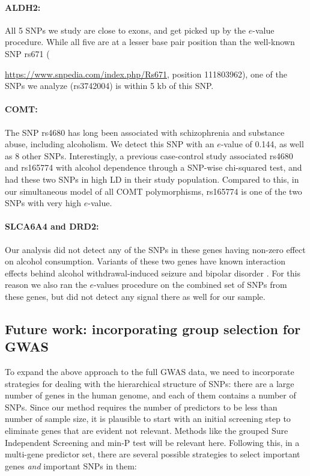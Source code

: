 \paragraph{ALDH2:} All 5 SNPs we study are close to exons, and get picked up by the $e$-value procedure. While all five are at a lesser base pair position than the well-known SNP rs671 ({\url{https://www.snpedia.com/index.php/Rs671}, position 111803962), one of the SNPs we analyze (rs3742004) is within 5 kb of this SNP.

\paragraph{COMT:} The SNP rs4680 has long been associated with schizophrenia and substance abuse, including alcoholism. We detect this SNP with an $e$-value of 0.144, as well as 8 other SNPs. Interestingly, a previous case-control study \citep{VoiseyEtal11} associated rs4680 and rs165774 with alcohol dependence through a SNP-wise chi-squared test, and had these two SNPs in high LD in their study population. Compared to this, in our simultaneous model of all COMT polymorphisms, rs165774 is one of the two SNPs with very high $e$-value.

\paragraph{SLCA6A4 and DRD2:} Our analysis did not detect any of the SNPs in these genes having non-zero effect on alcohol consumption. Variants of these two genes have known interaction effects behind alcohol withdrawal-induced seizure \citep{KarpyakEtal10} and bipolar disorder \citep{WangEtal14}. For this reason we also ran the $e$-values procedure on the combined set of SNPs from these genes, but did not detect any signal there as well for our sample.
 


\subsection{Future work: incorporating group selection for GWAS}
To expand the above approach to the full GWAS data, we need to incorporate strategies for dealing with the hierarchical structure of SNPs: there are a large number of genes in the human genome, and each of them contains a number of SNPs. Since our method requires the number of predictors to be less than number of sample size, it is plausible to start with an initial screening step to eliminate genes that are evident not relevant. Methods like the grouped Sure Independent Screening \citep{LiZhongZhu12} and min-P test \citep{WestfallYoungBook93} will be relevant here. Following this, in a multi-gene predictor set, there are several possible strategies to select important genes \textit{and} important SNPs in them:

}
